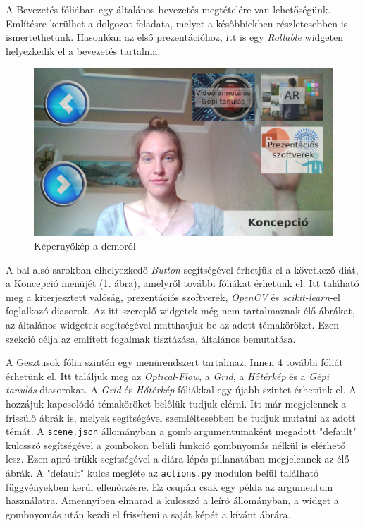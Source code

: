 A Bevezetés fóliában egy általános bevezetés megtételére van lehetőségünk. Említésre kerülhet a dolgozat feladata, melyet a későbbiekben részletesebben is ismertethetünk. Hasonlóan az első prezentációhoz, itt is egy \textit{Rollable} widgeten helyezkedik el a bevezetés tartalma.

\begin{figure}[h]
\centering
\includegraphics[width=\textwidth]{images/dolgozat_demo_screenshot.png}
\caption{Képernyőkép a demoról}
\label{fig:dolgozatdemo}
\end{figure}

A bal alsó sarokban elhelyezkedő \textit{Button} segítségével érhetjük el a következő diát, a Koncepció menüjét (\ref{fig:dolgozatdemo}. ábra), amelyről további fóliákat érhetünk el. Itt taláható meg a kiterjesztett valóság, prezentációs szoftverek, \textit{OpenCV} és \textit{scikit-learn}-el foglalkozó diasorok. Az itt szereplő widgetek még nem tartalmaznak élő-ábrákat, az általános widgetek segítségével mutthatjuk be az adott témaköröket. Ezen szekció célja az említett fogalmak tisztázása, általános bemutatása.

A Gesztusok fólia szintén egy menürendszert tartalmaz. Innen 4 további fóliát érhetünk el.
Itt találjuk meg az \textit{Optical-Flow}, a \textit{Grid}, a \textit{Hőtérkép} és a \textit{Gépi tanulás} diasorokat. A \textit{Grid} és \textit{Hőtérkép} fóliákkal egy újabb szintet érhetünk el. A hozzájuk kapcsolódó témaköröket belőlük tudjuk elérni. Itt már megjelennek a frissülő ábrák is, melyek segítségével szemléltesebben be tudjuk mutatni az adott témát.
A \texttt{scene.json} állományban a gomb argumentumaként megadott "default" kulcsszó segítségével a gombokon belüli funkció gombnyomás nélkül is elérhető lesz. Ezen apró trükk segítségével a diára lépés pillanatában megjelennek az élő ábrák. A "default" kulcs megléte az \texttt{actions.py} modulon belül található függvényekben kerül ellenőrzésre. Ez csupán csak egy példa az argumentum használatra. Amennyiben elmarad a kulcsszó a leíró állományban, a widget a gombnyomás után kezdi el frissíteni a saját képét a kívánt ábrára.

